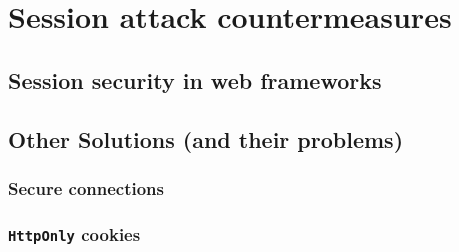 \chapter{Session attack countermeasures}

\section{Session security in web frameworks}\label{frameworks}

\section{Other Solutions (and their problems)}\label{other-solutions}

\subsection{Secure connections}\label{ssl}

\subsection{\texttt{HttpOnly} cookies}\label{httponly}
